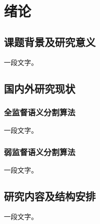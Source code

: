 \chapter{绪论}
\section{课题背景及研究意义}
一段文字。
\section{国内外研究现状}
\subsection{全监督语义分割算法}
一段文字。
\subsection{弱监督语义分割算法}
一段文字。
\section{研究内容及结构安排}
一段文字。
